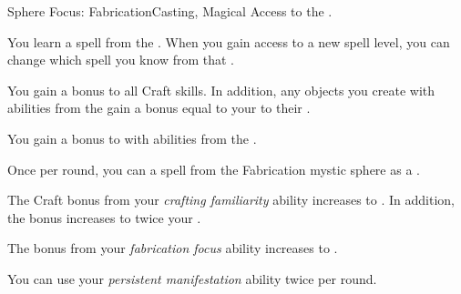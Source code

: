     \begin{feat}{Sphere Focus: Fabrication}{Casting, Magical}
        \featpre Access to the  .

         You learn a spell from the  .
        When you gain access to a new spell level, you can change which spell you know from that .

         You gain a  bonus to all Craft skills.
        In addition, any objects you create with abilities from the   gain a bonus equal to your  to their .

         You gain a  bonus to  with abilities from the  .

         Once per round, you can  a spell from the Fabrication mystic sphere as a .

         The Craft bonus from your \textit{crafting familiarity} ability increases to .
        In addition, the  bonus increases to twice your .

         The bonus from your \textit{fabrication focus} ability increases to .

         You can use your \textit{persistent manifestation} ability twice per round.
    \end{feat}

